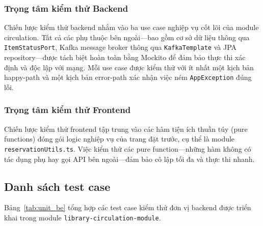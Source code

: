 \subsubsection{Trọng tâm kiểm thử Backend}
Chiến lược kiểm thử backend nhắm vào ba use case nghiệp vụ cốt lõi của module
circulation. Tất cả các phụ thuộc bên ngoài---bao gồm cơ sở dữ liệu thông qua
\texttt{ItemStatusPort}, Kafka message broker thông qua \texttt{KafkaTemplate} và
JPA repository---được tách biệt hoàn toàn bằng Mockito để đảm bảo thực thi xác
định và độc lập với mạng. Mỗi use case được kiểm thử với ít nhất một kịch bản
happy-path và một kịch bản error-path xác nhận việc ném \texttt{AppException} đúng
lỗi.

\subsubsection{Trọng tâm kiểm thử Frontend}
Chiến lược kiểm thử frontend tập trung vào các hàm tiện ích thuần túy (pure
functions) đóng gói logic nghiệp vụ của trang đặt trước, cụ thể là module
\texttt{reservationUtils.ts}. Việc kiểm thử các pure function---những hàm không có
tác dụng phụ hay gọi API bên ngoài---đảm bảo cô lập tối đa và thực thi nhanh.

\subsection{Danh sách test case}

Bảng~\ref{tab:unit_be} tổng hợp các test case kiểm thử đơn vị backend được triển
khai trong module \texttt{library-circulation-module}.

